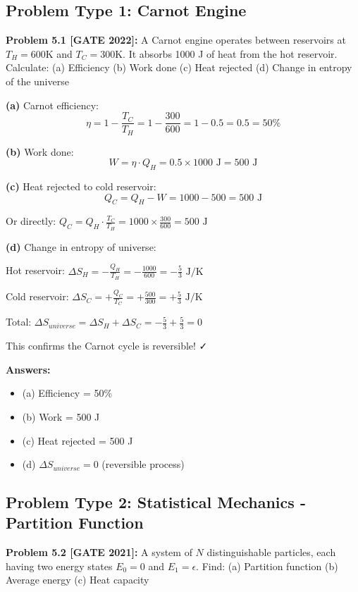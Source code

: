 \documentclass[12pt,a4paper]{article}
\begin{document}
\subsection{Problem Type 1: Carnot Engine}

\textbf{Problem 5.1 [GATE 2022]:} A Carnot engine operates between reservoirs at $T_H = 600$K and $T_C = 300$K. It absorbs 1000 J of heat from the hot reservoir. Calculate:
(a) Efficiency
(b) Work done
(c) Heat rejected
(d) Change in entropy of the universe

\begin{solution}
\textbf{(a)} Carnot efficiency:
$$\eta = 1 - \frac{T_C}{T_H} = 1 - \frac{300}{600} = 1 - 0.5 = 0.5 = 50\%$$

\textbf{(b)} Work done:
$$W = \eta \cdot Q_H = 0.5 \times 1000\text{ J} = 500\text{ J}$$

\textbf{(c)} Heat rejected to cold reservoir:
$$Q_C = Q_H - W = 1000 - 500 = 500\text{ J}$$

Or directly: $Q_C = Q_H \cdot \frac{T_C}{T_H} = 1000 \times \frac{300}{600} = 500\text{ J}$

\textbf{(d)} Change in entropy of universe:

Hot reservoir: $\Delta S_H = -\frac{Q_H}{T_H} = -\frac{1000}{600} = -\frac{5}{3}\text{ J/K}$

Cold reservoir: $\Delta S_C = +\frac{Q_C}{T_C} = +\frac{500}{300} = +\frac{5}{3}\text{ J/K}$

Total: $\Delta S_{universe} = \Delta S_H + \Delta S_C = -\frac{5}{3} + \frac{5}{3} = 0$

This confirms the Carnot cycle is reversible! ✓

\textbf{Answers:}
\begin{itemize}
    \item (a) Efficiency = 50\%
    \item (b) Work = 500 J
    \item (c) Heat rejected = 500 J
    \item (d) $\Delta S_{universe} = 0$ (reversible process)
\end{itemize}
\end{solution}

\subsection{Problem Type 2: Statistical Mechanics - Partition Function}

\textbf{Problem 5.2 [GATE 2021]:} A system of $N$ distinguishable particles, each having two energy states $E_0 = 0$ and $E_1 = \epsilon$. Find:
(a) Partition function
(b) Average energy
(c) Heat capacity
\end{document}
